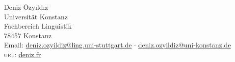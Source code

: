 \documentclass[11pt, a4paper]{article} %
\begin{document}


{\LARGE Deniz \"Ozy\i ld\i z}\\[.5em] %
Universit\"at Konstanz \\
Fachbereich Linguistik \\
78457 Konstanz\\[.25em] 
Email:
\href{mailto:deniz.ozyildiz@ling.uni-stuttgart.de}{deniz.ozyildiz@ling.uni-stuttgart.de}
$\cdot$ \href{mailto:deniz.ozyildiz@uni-konstanz.de}{deniz.ozyildiz@uni-konstanz.de}\\ %
\textsc{url}: \href{deniz.fr}{deniz.fr} %





%

%
%

\end{document}
